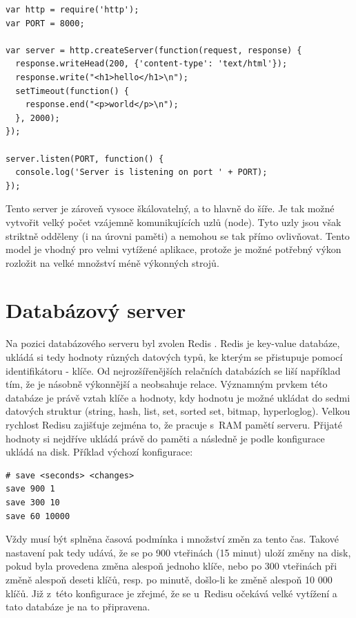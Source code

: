 \begin{verbatim}
var http = require('http');
var PORT = 8000;

var server = http.createServer(function(request, response) {
  response.writeHead(200, {'content-type': 'text/html'});
  response.write("<h1>hello</h1>\n");
  setTimeout(function() {
    response.end("<p>world</p>\n");
  }, 2000);
});

server.listen(PORT, function() {
  console.log('Server is listening on port ' + PORT);
});
\end{verbatim}

Tento server je zároveň vysoce škálovatelný, a to hlavně do šíře. Je tak možné vytvořit velký počet vzájemně komunikujících uzlů (node). Tyto uzly jsou však striktně odděleny (i na úrovni paměti) a nemohou se tak přímo ovlivňovat. Tento model je vhodný pro velmi vytížené aplikace, protože je možné potřebný výkon rozložit na velké množství méně výkonných strojů.

\section{Databázový server}
Na pozici databázového serveru byl zvolen Redis \cite{redis}.  Redis je key-value databáze, ukládá  si tedy hodnoty různých datových typů, ke kterým se přistupuje pomocí identifikátoru - klíče. Od nejrozšířenějších relačních databázích se liší například tím, že je násobně výkonnější a neobsahuje relace. Významným prvkem této databáze je právě vztah klíče a hodnoty, kdy hodnotu je možné ukládat do sedmi datových struktur (string, hash, list, set, sorted set, bitmap, hyperloglog). Velkou rychlost Redisu zajišťuje zejména to, že pracuje s~RAM pamětí serveru. Přijaté hodnoty si nejdříve ukládá právě do paměti a následně je podle konfigurace ukládá na disk. Příklad výchozí konfigurace:

\begin{verbatim}
# save <seconds> <changes>
save 900 1
save 300 10
save 60 10000
\end{verbatim}

Vždy musí být splněna časová podmínka i množství změn za tento čas. Takové nastavení pak tedy udává, že se po 900 vteřinách (15 minut) uloží změny na disk, pokud byla provedena změna alespoň jednoho klíče, nebo po 300 vteřinách při změně alespoň deseti klíčů, resp. po minutě, došlo-li ke změně alespoň 10 000 klíčů. Již z~této konfigurace je zřejmé, že se u~Redisu očekává velké vytížení a tato databáze je na to připravena.

